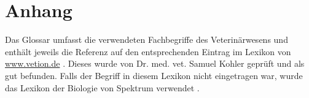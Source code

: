 

\chapter{Anhang}


	
		
\label{Glossar}

Das Glossar umfasst die verwendeten Fachbegriffe des Veterinärwesens und enthält jeweils die Referenz auf den entsprechenden Eintrag im Lexikon von \newline \url{www.vetion.de} \citep{GmbH2009}. Dieses wurde von Dr. med. vet. Samuel Kohler geprüft und als gut befunden. Falls der Begriff in diesem Lexikon nicht eingetragen war, wurde das \glqq{}Lexikon der Biologie\grqq{} von Spektrum verwendet \citep{Sauermost1999a}.
\glsaddall
\printglossary

	

